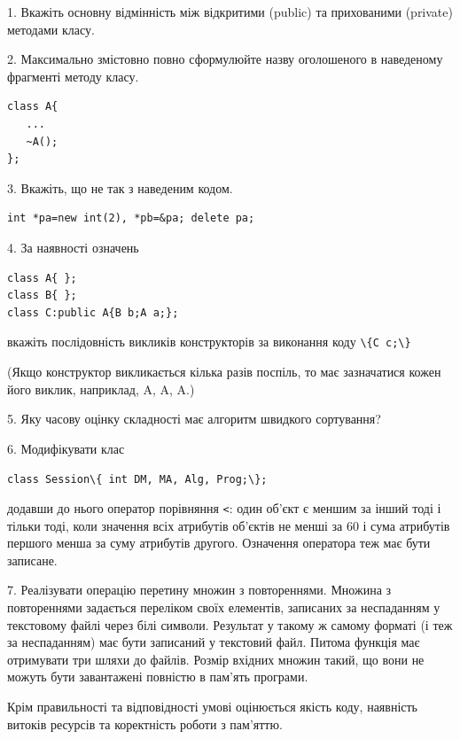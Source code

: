 \documentclass[12pt, ukrainian]{article}
\def\code#1{\Verb!#1!}
\begin{document}
{%
1. Вкажіть основну відмінність між відкритими (public) та прихованими (private) методами класу.%
\par
\vspace{2mm}
2. Максимально змістовно повно сформулюйте назву оголошеного в наведеному фрагменті методу класу.
\vspace{-3mm}
\begin{verbatim}class A{
   ...
   ~A();
};\end{verbatim}
\vspace{-3mm}
\par
\vspace{2mm}
3. Вкажіть, що не так з наведеним кодом.
\vspace{-3mm}
\begin{verbatim}int *pa=new int(2), *pb=&pa; delete pa;\end{verbatim}
\vspace{-3mm}
\par
\vspace{2mm}
4. За наявності означень
\vspace{-3mm}
\begin{verbatim}
class A{ };
class B{ };
class C:public A{B b;A a;};\end{verbatim}
\vspace{-3mm}
вкажіть послідовність викликів конструкторів за виконання коду \code{\{C c;\}} 

(Якщо конструктор викликається кілька разів поспіль, то має зазначатися кожен його виклик, наприклад, A, A, A.)

\vspace{2mm}
5. Яку часову оцінку складності має алгоритм швидкого сортування?
\par
\vspace{2mm}
6. Модифікувати клас 

\qquad\code{class Session\{ int DM, MA, Alg, Prog;\};} 


додавши до нього оператор порівняння \code{<}: один об'єкт є меншим за інший тоді і тільки тоді, коли значення всіх атрибутів об'єктів не менші за 60 і сума атрибутів першого менша за суму атрибутів другого. Означення оператора теж має бути записане.%
\par
\vspace{2mm}
7. 
Реалізувати операцію перетину множин з повтореннями. Множина з повтореннями задається переліком своїх елементів, записаних за неспаданням у текстовому файлі через білі символи. Результат у такому ж самому форматі (і теж за неспаданням) має бути записаний у текстовий файл. Питома функція має отримувати три шляхи до файлів. Розмір вхідних множин такий, що вони не можуть бути завантажені повністю в пам’ять програми.

Крім правильності та відповідності умові оцінюється якість коду, наявність витоків ресурсів та коректність роботи з пам'яттю. 

}
\end{document}
